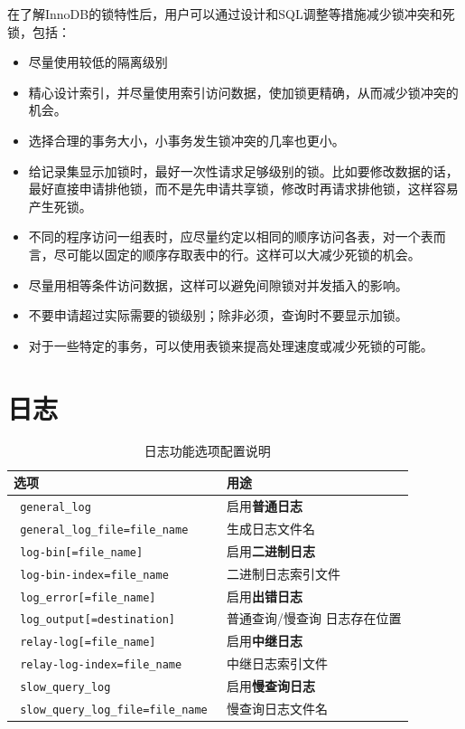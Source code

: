 \documentclass[UTF8,a4paper,12pt]{ctexbook}
\begin{document}
			在了解InnoDB的锁特性后，用户可以通过设计和SQL调整等措施减少锁冲突和死锁，包括：
			\begin{itemize}
				\item 尽量使用较低的隔离级别
				\item 精心设计索引，并尽量使用索引访问数据，使加锁更精确，从而减少锁冲突的机会。
				\item 选择合理的事务大小，小事务发生锁冲突的几率也更小。
				\item 给记录集显示加锁时，最好一次性请求足够级别的锁。比如要修改数据的话，最好直接申请排他锁，而不是先申请共享锁，修改时再请求排他锁，这样容易产生死锁。
				\item 不同的程序访问一组表时，应尽量约定以相同的顺序访问各表，对一个表而言，尽可能以固定的顺序存取表中的行。这样可以大减少死锁的机会。
				\item 尽量用相等条件访问数据，这样可以避免间隙锁对并发插入的影响。
				\item 不要申请超过实际需要的锁级别；除非必须，查询时不要显示加锁。
				\item 对于一些特定的事务，可以使用表锁来提高处理速度或减少死锁的可能。
			\end{itemize}
		
		
\chapter{日志}
	
	\begin{table}[H]
		\centering
		\caption{日志功能选项配置说明}
		\begin{tabular}{p{9cm} | p{7cm}}
			\toprule[1.5pt]
				选项  &   用途 	\\
			\midrule
				\verb| general_log | &  启用\textbf{普通日志}	\\
				\verb| general_log_file=file_name | & 生成日志文件名  	\\
				\verb| log-bin[=file_name] | &  	启用\textbf{二进制日志} \\
				\verb| log-bin-index=file_name | &  二进制日志索引文件	\\
				\verb| log_error[=file_name] | &   启用\textbf{出错日志}	\\
				\verb| log_output[=destination] | &  普通查询/慢查询 日志存在位置	\\
				\verb| relay-log[=file_name] | &  启用\textbf{中继日志}	\\
				\verb| relay-log-index=file_name | &  中继日志索引文件	\\
				\verb| slow_query_log | &  启用\textbf{慢查询日志}	\\
				\verb| slow_query_log_file=file_name | &  慢查询日志文件名	\\
			\bottomrule[1.5pt]
		\end{tabular}
	\end{table}
	
\end{document}
